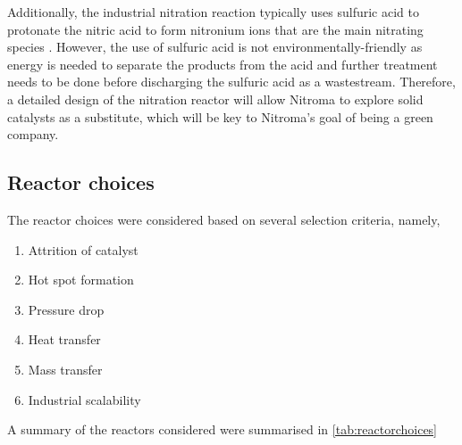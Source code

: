 Additionally, the industrial nitration reaction typically uses sulfuric acid to protonate the nitric acid to form nitronium ions that are the main nitrating species \cite{sreedhar_scientific_2013}. However, the use of sulfuric acid is not environmentally-friendly as energy is needed to separate the products from the acid and further treatment needs to be done before discharging the sulfuric acid as a wastestream. Therefore, a detailed design of the nitration reactor will allow Nitroma to explore solid catalysts as a substitute, which will be key to Nitroma's goal of being a green company.  

\subsection{Reactor choices}
The reactor choices were considered based on several selection criteria, namely,
\begin{enumerate}
    \item Attrition of catalyst
    \item Hot spot formation
    \item Pressure drop
    \item Heat transfer
    \item Mass transfer
    \item Industrial scalability
\end{enumerate}
A summary of the reactors considered were summarised in \cref{tab:reactorchoices}
